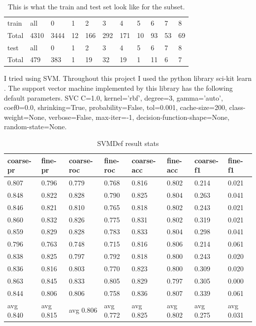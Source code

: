 \documentclass[ms]{nuthesis}
\begin{document}
\FloatBarrier
\begin{table}[H]
  \centering
  \begin{tabular}{|l||l||l||l||l||l||l||l||l||l||l|}\toprule
    train & all & 0 & 1 & 2 & 3 & 4 & 5 & 6 & 7 & 8 \\
    Total & 4310 & 3444 & 12 & 166 & 292 & 171 & 10 & 93 & 53 & 69 \\ \midrule
    test & all & 0 & 1 & 2 & 3 & 4 & 5 & 6 & 7 & 8 \\
    Total & 479 & 383 & 1 & 19 & 32 & 19 & 1 & 11 & 6 & 7 \\
 \bottomrule
  \end{tabular}
  \caption{This is what the train and test set look like for the subset.}
  \label{tab:subTrainTest}
\end{table}
\FloatBarrier


\par I tried using SVM. Throughout this project I used the python library sci-kit learn \cite{scikit-learn}.
The support vector machine implemented by this library has the following default parameters. SVC C=1.0,
kernel='rbf', degree=3, gamma='auto', coef0=0.0, shrinking=True, probability=False, tol=0.001, cache-size=200,
class-weight=None, verbose=False, max-iter=-1, decision-function-shape=None, random-state=None.



\FloatBarrier
\begin{table}[H]
\centering
\begin{tabular}{|l||l||l||l||l||l||l||l|}\toprule
coarse-pr & fine-pr & coarse-roc & fine-roc & coarse-acc & fine-acc & coarse-f1 & fine-f1 \\ \midrule
0.807 & 0.796 & 0.779 & 0.768 & 0.816 & 0.802 & 0.214 & 0.021 \\
0.848 & 0.822 & 0.828 & 0.790 & 0.825 & 0.804 & 0.263 & 0.041 \\
0.846 & 0.821 & 0.810 & 0.765 & 0.818 & 0.802 & 0.243 & 0.021 \\
0.860 & 0.832 & 0.826 & 0.775 & 0.831 & 0.802 & 0.319 & 0.021 \\
0.859 & 0.829 & 0.828 & 0.783 & 0.833 & 0.804 & 0.298 & 0.041 \\
0.796 & 0.763 & 0.748 & 0.715 & 0.816 & 0.806 & 0.214 & 0.061 \\
0.838 & 0.825 & 0.797 & 0.792 & 0.818 & 0.800 & 0.243 & 0.020 \\
0.836 & 0.816 & 0.803 & 0.770 & 0.823 & 0.800 & 0.309 & 0.020 \\
0.863 & 0.845 & 0.833 & 0.805 & 0.829 & 0.797 & 0.305 & 0.000 \\
0.844 & 0.806 & 0.806 & 0.758 & 0.836 & 0.807 & 0.339 & 0.061 \\
avg 0.840 & avg 0.815 & avg 0.806 & avg 0.772 & avg 0.825 & avg 0.802 & avg 0.275 & avg 0.031 \\ \bottomrule
\end{tabular}
\caption{SVMDef result stats}
\label{tab:SVMDefResStats}
\end{table}
\FloatBarrier
\end{document}
